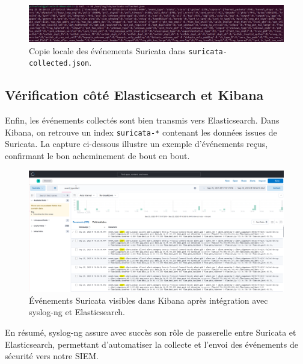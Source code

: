 \begin{figure}[H]
    \centering
    \includegraphics[width=0.9\linewidth]{assets/figures/sng-localcopy.png}
    \caption{Copie locale des événements Suricata dans \texttt{suricata-collected.json}.}
\end{figure}

\subsection{Vérification côté Elasticsearch et Kibana}
Enfin, les événements collectés sont bien transmis vers Elasticsearch. Dans Kibana, on retrouve un index \texttt{suricata-*} contenant les données issues de Suricata.  
La capture ci-dessous illustre un exemple d’événements reçus, confirmant le bon acheminement de bout en bout.

\begin{figure}[H]
    \centering
    \includegraphics[width=0.8\linewidth]{assets/figures/es-search-suricata.png}
    \caption{Événements Suricata visibles dans Kibana après intégration avec syslog-ng et Elasticsearch.}
\end{figure}

\bigskip
En résumé, syslog-ng assure avec succès son rôle de passerelle entre Suricata et Elasticsearch, permettant d’automatiser la collecte et l’envoi des événements de sécurité vers notre SIEM.